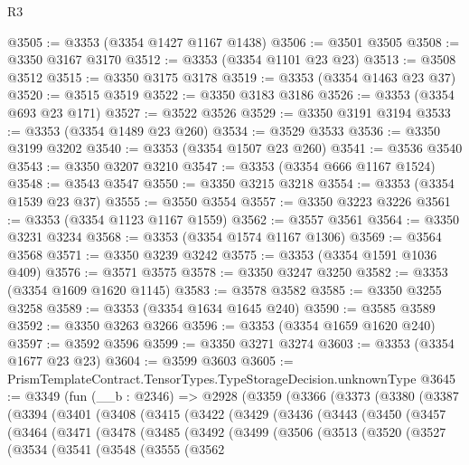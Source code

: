 \begin{lexlean}{R3}
\begin{coremodule}
@3505 := @3353 (@3354 @1427 @1167 @1438)
@3506 := @3501 @3505
@3508 := @3350 @3167 @3170
@3512 := @3353 (@3354 @1101 @23 @23)
@3513 := @3508 @3512
@3515 := @3350 @3175 @3178
@3519 := @3353 (@3354 @1463 @23 @37)
@3520 := @3515 @3519
@3522 := @3350 @3183 @3186
@3526 := @3353 (@3354 @693 @23 @171)
@3527 := @3522 @3526
@3529 := @3350 @3191 @3194
@3533 := @3353 (@3354 @1489 @23 @260)
@3534 := @3529 @3533
@3536 := @3350 @3199 @3202
@3540 := @3353 (@3354 @1507 @23 @260)
@3541 := @3536 @3540
@3543 := @3350 @3207 @3210
@3547 := @3353 (@3354 @666 @1167 @1524)
@3548 := @3543 @3547
@3550 := @3350 @3215 @3218
@3554 := @3353 (@3354 @1539 @23 @37)
@3555 := @3550 @3554
@3557 := @3350 @3223 @3226
@3561 := @3353 (@3354 @1123 @1167 @1559)
@3562 := @3557 @3561
@3564 := @3350 @3231 @3234
@3568 := @3353 (@3354 @1574 @1167 @1306)
@3569 := @3564 @3568
@3571 := @3350 @3239 @3242
@3575 := @3353 (@3354 @1591 @1036 @409)
@3576 := @3571 @3575
@3578 := @3350 @3247 @3250
@3582 := @3353 (@3354 @1609 @1620 @1145)
@3583 := @3578 @3582
@3585 := @3350 @3255 @3258
@3589 := @3353 (@3354 @1634 @1645 @240)
@3590 := @3585 @3589
@3592 := @3350 @3263 @3266
@3596 := @3353 (@3354 @1659 @1620 @240)
@3597 := @3592 @3596
@3599 := @3350 @3271 @3274
@3603 := @3353 (@3354 @1677 @23 @23)
@3604 := @3599 @3603
@3605 := PrismTemplateContract.TensorTypes.TypeStorageDecision.unknownType
@3645 := @3349
    (fun (__b : @2346) =>
    @2928
      (@3359
        (@3366
          (@3373
            (@3380
              (@3387
                (@3394
                  (@3401
                    (@3408
                      (@3415
                        (@3422
                          (@3429
                            (@3436
                              (@3443
                                (@3450
                                  (@3457
                                    (@3464
                                      (@3471
                                        (@3478
                                          (@3485
                                            (@3492
                                              (@3499
                                                (@3506
                                                  (@3513
                                                    (@3520
                                                      (@3527
                                                        (@3534
                                                          (@3541
                                                            (@3548
                                                              (@3555
                                                                (@3562

\end{coremodule}
\end{lexlean}
